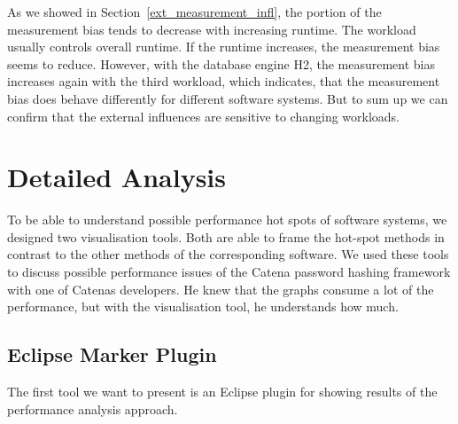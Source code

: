 
As we showed in Section~\ref{ext_measurement_infl}, the portion of the measurement bias tends to decrease with increasing runtime. The workload usually controls overall runtime. If the runtime increases, the measurement bias seems to reduce. However, with the database engine H2, the measurement bias increases again with the third workload, which indicates, that the measurement bias does behave differently for different software systems.
But to sum up we can confirm that the external influences are sensitive to changing workloads.


\section{Detailed Analysis}
\label{delailed_analysis}

To be able to understand possible performance hot spots of software systems, we designed two visualisation tools. Both are able to frame the hot-spot methods in contrast to the other methods of the corresponding software. We used these tools to discuss possible performance issues of the Catena password hashing framework with one of Catenas developers. He knew that the graphs consume a lot of the performance, but with the visualisation tool, he understands how much.






\subsection{Eclipse Marker Plugin}
\label{eclipse_plugin}

The first tool we want to present is an Eclipse plugin for showing results of the performance analysis approach. 

